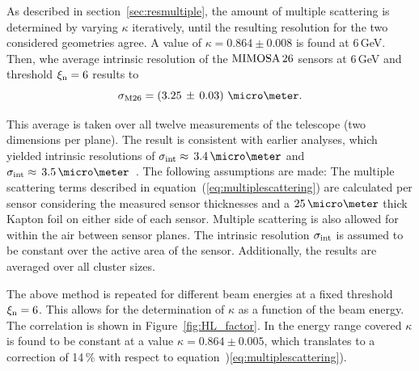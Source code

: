As described in section~\ref{sec:resmultiple}, the amount of multiple scattering is determined by varying $\kappa$ iteratively, until the resulting resolution for the two considered geometries agree. 
A value of $\kappa = 0.864 \pm 0.008$ is found at 6\,GeV. 
Then, whe average intrinsic resolution of the $\textrm{MIMOSA\,26}$ sensors at 6\,GeV and threshold $\xi_{\textrm{n}} = 6$ results to
\begin{equation}
 \sigma_{\textrm{M26}} = \left( 3.25\,\pm\, \allowbreak 0.03 \right)\,\micro\meter.  
\end{equation}

\noindent
This average is taken over all twelve measurements of the telescope (two dimensions per plane). 
The result is consistent with earlier analyses, which yielded intrinsic resolutions of $\sigmai \approx\,3.4\,\micro\meter$ and $\sigmai \approx\,3.5\,\micro\meter$~\cite{ref:thomas,ref:mimosa26}.
The following assumptions are made: 
The multiple scattering terms described in equation~(\ref{eq:multiplescattering}) are calculated per sensor considering the measured sensor thicknesses
 and a $25\,\micro\meter$ thick Kapton foil on either side of each sensor.
Multiple scattering is also allowed for within the air between sensor planes. 
The intrinsic resolution $\sigma_{\textrm{int}}$ is assumed to be constant over the active area of the sensor. 
Additionally, the results are averaged over all cluster sizes. 


The above method is repeated for different beam energies at a fixed threshold $\xi_{\textrm{n}} = 6$. 
This allows for the determination of $\kappa$ as a function of the beam energy. 
The correlation is shown in Figure~\ref{fig:HL_factor}. 
In the energy range covered $\kappa$ is found to be constant at a value $\kappa = 0.864 \pm 0.005$, which translates to a correction of 14\,\% with respect to equation~)\ref{eq:multiplescattering}).

